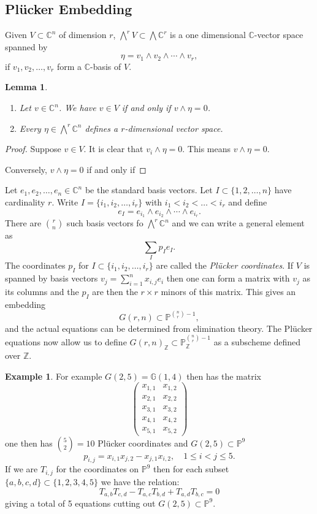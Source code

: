 \documentclass[12pt]{article}
\numberwithin{equation}{section}
\newtheorem{lemma}[theorem]{Lemma}
\theoremstyle{definition}
\newtheorem{example}[theorem]{Example}
\theoremstyle{remark}
\newcommand{\CC}{\mathbb{C}}
\newcommand{\ZZ}{\mathbb{Z}}
\newcommand{\PP}{\mathbb{P}}
\newcommand{\GG}{\mathbb{G}}
\begin{document}
\subsection{Pl\"{u}cker Embedding}
Given $V \subset \CC^n$ of dimension $r$, $\bigwedge^rV \subset \bigwedge \CC^r$ is a one dimensional $\CC$-vector space spanned by 
$$\eta=v_1\wedge v_2 \wedge \cdots \wedge v_r,$$ 
if $v_1,v_2,\ldots, v_r$ form a $\CC$-basis of $V$. 
\begin{lemma}
	\begin{enumerate}
		\item Let $v\in \CC^n$. We have $v\in V$ if and only if $v\wedge \eta =0$.
		\item Every $\eta \in \bigwedge^r\CC^n$ defines a $r$-dimensional vector space. 
	\end{enumerate}
\end{lemma}
\begin{proof}
	Suppose $v\in V$. 
	It is clear that $v_i\wedge \eta=0$. 
	This means $v\wedge \eta=0$. 
	
	Conversely, $v\wedge \eta =0$ if and only if 
\end{proof}
Let $e_1,e_2,\ldots, e_n \in \CC^n$ be the standard basis vectors. 
Let $I\subset \lbrace 1,2,\ldots, n \rbrace$ have cardinality $r$. 
Write $I = \lbrace i_1,i_2,\ldots, i_r \rbrace$ with $i_1<i_2<\ldots<i_r$ and define
$$ e_I = e_{i_1}\wedge e_{i_2} \wedge \cdots \wedge e_{i_r}. $$
There are ${r \choose n}$ such basis vectors fo $\bigwedge^r\CC^n$ and we can write a general element as 
$$ \sum_{I}p_I e_I. $$
The coordinates $p_I$ for $I\subset \lbrace i_1,i_2,\ldots,i_r\rbrace$ are called the \emph{Pl\"{u}cker coordinates}.
If $V$ is spanned by basis vectors $v_j = \sum_{i=1}^n x_{i,j}e_i$ then one can form a matrix with $v_j$ as its columns and the $p_I$ are then the $r\times r$ minors of this matrix.
This gives an embedding 
$$ G(r,n) \subset \PP^{{n \choose r} -1}, $$
and the actual equations can be determined from elimination theory. 
The Pl\"{u}cker equations now allow us to define $G(r,n)_{\ZZ} \subset \PP^{{n \choose r} -1}_{\ZZ}$ as a subscheme defined over $\ZZ$.  


\begin{example}
	For example $G(2,5)=\GG(1,4)$ then has the matrix
	$$ \begin{pmatrix}
	x_{1,1} & x_{1,2}  \\
	x_{2,1} & x_{2,2} \\
	x_{3,1} & x_{3,2} \\
	x_{4,1} & x_{4,2} \\
	x_{5,1} & x_{5,2}
	\end{pmatrix}
	$$ 
	one then has ${5 \choose 2} = 10$ Pl\"{u}cker coordinates and $G(2,5)\subset \PP^9$ 
	$$ p_{i,j}=x_{i,1}x_{j,2}-x_{j,1}x_{i,2}, \quad 1\leq i<j \leq 5.$$
	If we are $T_{i,j}$ for the coordinates on $\PP^9$ then for each subset $\lbrace a,b,c,d\rbrace \subset \lbrace 1,2,3,4,5\rbrace$ we have the relation:
	$$ T_{a,b}T_{c,d}-T_{a,c}T_{b,d} + T_{a,d}T_{b,c} =0$$
	giving a total of 5 equations cutting out $G(2,5)\subset \PP^9$.
\end{example}
\end{document}
